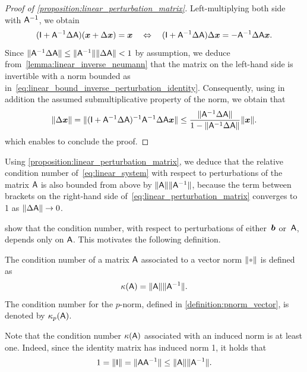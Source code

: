 \begin{proof}
    [Proof of \cref{proposition:linear_perturbation_matrix}]
    Left-multiplying both side with $\mathsf A^{-1}$,
    we obtain
    \begin{equation}
        \label{eq:linear_perturbation_matrix_initial}
        (\mathsf I + \mathsf A^{-1} \Delta \mathsf A) (\mathbf{\boldsymbol{x}} + \Delta \mathbf{\boldsymbol{x}}) = \mathbf{\boldsymbol{x}}
        \quad \Leftrightarrow \quad
        (\mathsf I + \mathsf A^{-1} \Delta \mathsf A) \Delta \mathbf{\boldsymbol{x}} = - \mathsf A^{-1} \Delta \mathsf A \mathbf{\boldsymbol{x}}.
    \end{equation}
    Since $\lVert\mathsf A^{-1} \Delta \mathsf A\rVert \leq \lVert\mathsf A^{-1}\rVert \lVert\Delta \mathsf A\rVert < 1$ by assumption,
    we deduce from~\cref{lemma:linear_inverse_neumann} that the matrix on the left-hand side is invertible
    with a norm bounded as in~\eqref{eq:linear_bound_inverse_perturbation_identity}.
    Consequently,
    using in addition the assumed submultiplicative property of the norm,
    we obtain that
    \[
        \lVert\Delta \mathbf{\boldsymbol{x}}\rVert
        = \lVert(\mathsf I + \mathsf A^{-1} \Delta \mathsf A)^{-1} \mathsf A^{-1} \Delta \mathsf A \mathbf{\boldsymbol{x}}\rVert
        \leq \frac{\lVert\mathsf A^{-1} \Delta \mathsf A\rVert}{1 - \lVert\mathsf A^{-1} \Delta \mathsf A\rVert} \lVert\mathbf{\boldsymbol{x}}\rVert.
    \]
    which enables to conclude the proof.
\end{proof}
Using \cref{proposition:linear_perturbation_matrix},
we deduce that the relative condition number of~\eqref{eq:linear_system} with respect to perturbations of the matrix $\mathsf A$ is also bounded from above by $\lVert\mathsf A\rVert \lVert\mathsf A^{-1}\rVert$,
because the term between brackets on the right-hand side of~\eqref{eq:linear_perturbation_matrix} converges to 1 as $\lVert\Delta \mathsf A\rVert \to 0$.


 show that
the condition number, with respect to perturbations of either~$\mathbf{\boldsymbol{b}}$ or~$\mathsf A$,
depends only on $\mathsf A$.
This motivates the following definition.
\begin{definition}
    The condition number of a matrix $\mathsf A$ associated to a vector norm $\norm{\placeholder}$ is defined as
    \[
        \kappa(\mathsf A) = \lVert\mathsf A\rVert \lVert\mathsf A^{-1}\rVert.
    \]
    The condition number for the $p$-norm,
    defined in \cref{definition:pnorm_vector},
    is denoted by $\kappa_p(\mathsf A)$.
\end{definition}
Note that the condition number $\kappa(\mathsf A)$ associated with an induced norm is at least one.
Indeed, since the identity matrix has induced norm 1,
it holds that
\[
    1 = \lVert\mathsf I\rVert = \lVert\mathsf A \mathsf A^{-1}\rVert\leq \lVert\mathsf A\rVert \lVert\mathsf A^{-1}\rVert.
\]


